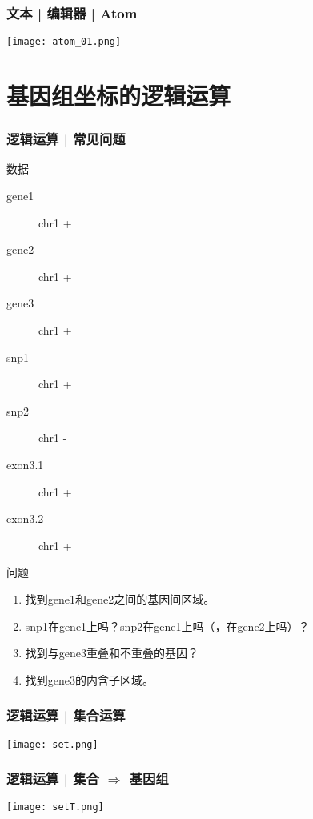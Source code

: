 \begin{frame}
  \frametitle{文本 | 编辑器 | Atom}
    \begin{center}
      \texttt{[image: atom\_01.png]}
    \end{center}
\end{frame}

\section{基因组坐标的逻辑运算}
\begin{frame}
  \frametitle{逻辑运算 | 常见问题}
  \begin{block}{数据}
    \begin{description}
      \item[gene1] chr1   \quad +
      \item[gene2] chr1   \quad +
      \item[gene3] chr1   \quad +
      \item[snp1] chr1  \quad +
      \item[snp2] chr1  \quad -
      \item[exon3.1] chr1   \quad +
      \item[exon3.2] chr1   \quad +
    \end{description}
  \end{block}
  \vspace{-0.5em}
  \pause
  \begin{block}{问题}
    \begin{enumerate}
      \item 找到gene1和gene2之间的基因间区域。
      \item snp1在gene1上吗？snp2在gene1上吗（，在gene2上吗）？
      \item 找到与gene3重叠和不重叠的基因？
      \item 找到gene3的内含子区域。
    \end{enumerate}
  \end{block}
\end{frame}

\begin{frame}
  \frametitle{逻辑运算 | 集合运算}
    \begin{center}
      \texttt{[image: set.png]}
    \end{center}
\end{frame}

\begin{frame}
  \frametitle{逻辑运算 | 集合 $\Rightarrow$ 基因组}
    \begin{center}
      \texttt{[image: setT.png]}
    \end{center}
\end{frame}

